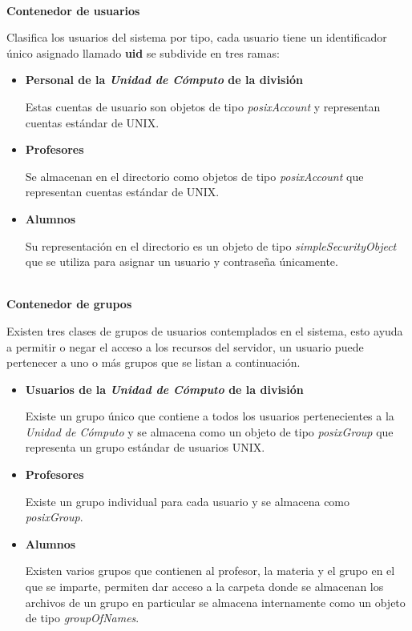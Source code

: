 \textbf{\\ Contenedor de usuarios \\}

Clasifica los usuarios del sistema por tipo, cada usuario tiene un identificador \'{u}nico asignado llamado \textbf{uid} se subdivide en tres ramas:

\begin{itemize}

  \item \textbf{Personal de la \textit{Unidad de C\'{o}mputo} de la divisi\'{o}n}

  Estas cuentas de usuario son objetos de tipo \textit{posixAccount} y representan cuentas est\'{a}ndar de \textsc{UNIX}.

  \item \textbf{Profesores}

  Se almacenan en el directorio como objetos de tipo \textit{posixAccount} que representan cuentas est\'{a}ndar de \textsc{UNIX}.

  \item \textbf{Alumnos}

  Su representaci\'{o}n en el directorio es un objeto de tipo \textit{simpleSecurityObject} que se utiliza para asignar un usuario y contrase\~{n}a \'{u}nicamente.

\end{itemize}

\textbf{\\ Contenedor de grupos \\}

Existen tres clases de grupos de usuarios contemplados en el sistema, esto ayuda a permitir o negar el acceso a los recursos del servidor, un usuario puede pertenecer a uno o m\'{a}s grupos que se listan a continuaci\'{o}n.

\begin{itemize}

  \item \textbf{Usuarios de la \textsl{Unidad de C\'{o}mputo} de la divisi\'{o}n}

  Existe un grupo \'{u}nico que contiene a todos los usuarios pertenecientes a la \textit{Unidad de C\'{o}mputo} y se almacena como un objeto de tipo \textit{posixGroup} que representa un grupo est\'{a}ndar de usuarios \textsc{UNIX}.

  \item \textbf{Profesores}

  Existe un grupo individual para cada usuario y se almacena como \textit{posixGroup}.

  \item \textbf{Alumnos}

  Existen varios grupos que contienen al profesor, la materia y el grupo en el que se imparte, permiten dar acceso a la carpeta donde se almacenan los archivos de un grupo en particular se almacena internamente como un objeto de tipo \textit{groupOfNames}.

\end{itemize}

